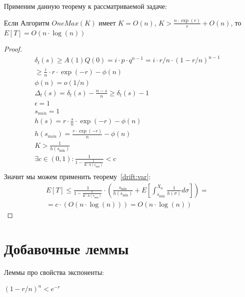 \documentclass[times,specification,annotation]{itmo-student-thesis}
\begin{document}
    Применим данную теорему к рассматриваемой задаче: \\

    \begin{theorem}
        Если Алгоритм $OneMax(K)$ имеет
        $K = O(n)$, $K > \frac{n \cdot \exp(r)}{r} + O(n)$, то
        $E[T] = O(n \cdot \log(n))$
    \end{theorem}
    \begin{proof}
        \begin{gather*}
            \delta_t(s) \geq A(1)Q(0) = i \cdot p \cdot q^{n - 1} = i \cdot r/n \cdot (1 - r/n)^{n - 1} \\
            \geq \frac{i}{n} \cdot r \cdot \exp(-r) - \phi(n) \\
            \phi(n) = o(1/n) \\
            \Delta_t(s) = \delta_t(s) - \frac{n - s}{n} \geq \delta_t(s) - 1 \\
            \epsilon = 1\\
            s_{min} = 1 \\
            h(s) = r \cdot \frac{s}{n} \cdot \exp(-r) - \phi(n) \\
            h(s_{min}) = \frac{r \cdot \exp(-r)}{n} - \phi(n) \\
            K > \frac{1}{h(s_{\min})} \\
            \exists c \in (0, 1): \frac{1}{1 - \frac{1}{K \cdot h(s_{\min})}} < c \\
        \end{gather*}
        Значит мы можем применить теорему~\eqref{drift:var}:
        \begin{gather*}
            E[T] \leq \frac{1}{1 - \frac{\epsilon}{K \cdot h(s_{\min})}} \cdot (\frac{s_{\min}}{h(s_{\min})} + E[\int_{s_{\min}}^{X_0}\frac{1}{h(\sigma)}d\sigma]) = \\
            = c \cdot (O(n \cdot \log(n))) = O(n \cdot \log(n))
        \end{gather*}

    \end{proof}


    \section{Добавочные леммы}

    Леммы про свойства экспоненты:
    \begin{lemma}
        \label{exp:less}
        $(1 - r/n)^n < e^{-r}$
    \end{lemma}
\end{document}
